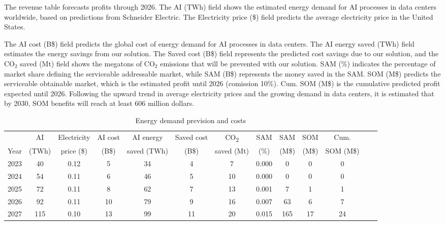 The revenue table forecasts profits through 2026. The AI (TWh) field shows the estimated energy demand for AI processes in data centers worldwide, based on predictions from Schneider Electric. The Electricity price (\$) field predicts the average electricity price in the United States. 

The AI cost (B\$) field predicts the global cost of energy demand for AI processes in data centers. The AI energy saved (TWh) field estimates the energy savings from our solution. The Saved cost (B\$) field represents the predicted cost savings due to our solution, and the CO$_2$ saved (Mt) field shows the megatons of CO$_2$ emissions that will be prevented with our solution. SAM (\%) indicates the percentage of market share defining the serviceable addressable market, while SAM (B\$) represents the money saved in the SAM. SOM (M\$) predicts the serviceable obtainable market, which is the estimated profit until 2026 (comission 10\%). Cum. SOM (M\$) is the cumulative predicted profit expected until 2026. Following the upward trend in average electricity prices and the growing demand in data centers, it is estimated that by 2030, SOM benefits will reach at least 606 million dollars.

\begin{table}[!h]
\footnotesize
\begin{tabular}{ccccccccccccc}
\toprule
 & AI & Electricity & AI cost & AI energy  & Saved cost & CO\textsubscript{2}  & SAM & SAM  & SOM  & Cum. \\
Year & (TWh) & price (\$) & (B\$) & saved (TWh) &  (B\$) & saved (Mt) & (\%) &   (M\$) & (M\$) & SOM (M\$) \\
\midrule
2023 & 40   & 0.12   & 5   & 34  & 4   & 7   & 0.000     & 0     & 0    & 0 \\
2024 & 54  & 0.11  & 6  & 46    & 5  & 10  & 0.000     & 0      & 0    & 0 \\
2025 & 72 & 0.11   & 8  & 62    & 7  & 13  & 0.001 	& 7  & 1 & 1 \\
2026 & 92 & 0.11  & 10  & 79  & 9  & 16  & 0.007 	& 63   & 6 & 7 \\
2027 & 115 & 0.10  & 13  & 99  & 11  & 20  & 0.015 	& 165   & 17 & 24 \\
\bottomrule
\end{tabular}
\caption{Energy demand prevision and costs}
\end{table}


